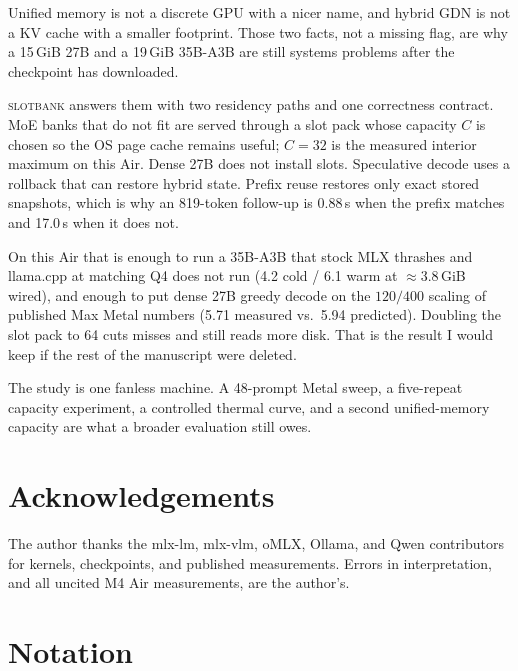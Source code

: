 \documentclass[11pt]{article}
\theoremstyle{definition}
\newcommand{\slotbank}{\textsc{slotbank}}
\begin{document}
Unified memory is not a discrete GPU with a nicer name, and hybrid GDN is not a KV cache with a smaller footprint. Those two facts, not a missing flag, are why a 15\,GiB 27B and a 19\,GiB 35B-A3B are still systems problems after the checkpoint has downloaded.

\slotbank{} answers them with two residency paths and one correctness contract. MoE banks that do not fit are served through a slot pack whose capacity $C$ is chosen so the OS page cache remains useful; $C{=}32$ is the measured interior maximum on this Air. Dense 27B does not install slots. Speculative decode uses a rollback that can restore hybrid state. Prefix reuse restores only exact stored snapshots, which is why an 819-token follow-up is 0.88\,s when the prefix matches and 17.0\,s when it does not.

On this Air that is enough to run a 35B-A3B that stock MLX thrashes and llama.cpp at matching Q4 does not run (4.2 cold / 6.1 warm at ${\approx}3.8$\,GiB wired), and enough to put dense 27B greedy decode on the $120/400$ scaling of published Max Metal numbers (5.71 measured vs.\ 5.94 predicted). Doubling the slot pack to 64 cuts misses and still reads more disk. That is the result I would keep if the rest of the manuscript were deleted.

The study is one fanless machine. A 48-prompt Metal sweep, a five-repeat capacity experiment, a controlled thermal curve, and a second unified-memory capacity are what a broader evaluation still owes.

\section*{Acknowledgements}

The author thanks the mlx-lm, mlx-vlm, oMLX, Ollama, and Qwen contributors for kernels, checkpoints, and published measurements. Errors in interpretation, and all uncited M4 Air measurements, are the author’s.




\appendix
\section{Notation}
\label{app:notation}
\end{document}
